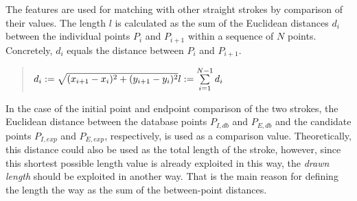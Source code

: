 The features are used for matching with other straight strokes by comparison
of their values. 
The length \(l\) is calculated as the sum of the Euclidean distances \(d_i\) 
between the individual points \(P_i\) and \(P_{i+1}\) within a sequence 
of \(N\) points. Concretely, \(d_i\) equals the distance between
\(P_i\) and \(P_{i+1}\).
\begin{quote}
\(
    d_i := \sqrt{(x_{i+1}-x_{i})^2+(y_{i+1}-y_{i})^2}\\
    l := \sum\limits_{i=1}^{N-1}{d_i}
\)
\end{quote}
In the case of the initial point and endpoint comparison of the two strokes, 
the Euclidean distance between the database points \(P_{I,db}\) and \(P_{E,db}\)
and the candidate points \(P_{I,exp}\) and \(P_{E,exp}\), respectively,
is used as a comparison value. 
Theoretically, this distance could also be used as the total length
of the stroke, however, since this shortest possible length value is 
already exploited in this way, the \emph{drawn length} should be exploited 
in another way. That is the main reason for defining the length the way as
the sum of the between-point distances.

